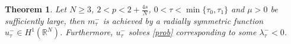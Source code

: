 \documentclass[11pt]{article}
\numberwithin{equation}{section}
\newtheorem{mytheorem}{Theorem}
\numberwithin{mytheorem}{section}
\begin{document}
	\begin{mytheorem}\label{Theorem 2}
		Let $N\geq 3$, $2<p<2+\frac{4s}{N}$, $0<\tau<\min\{\tau_0,\tau_1\}$ and $\mu>0$ be sufficiently large, then $m_{\tau}^-$ is achieved by a radially symmetric function $u_{\tau}^-\in H^1(\mathbb{R}^N)$. Furthermore, $u_{\tau}^-$ solves \eqref{prob} corresponding to some $\lambda_{\tau}^-<0$.
	\end{mytheorem}
\end{document}
